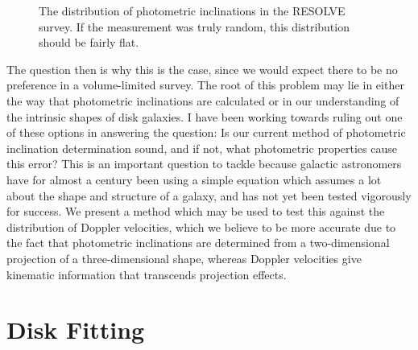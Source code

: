 \documentclass{emulateapj}
\begin{document}
\begin{figure}
\caption{The distribution of photometric inclinations in the RESOLVE survey. If the measurement was truly random, this distribution should be fairly flat. \label{fig:test}}
\end{figure}

The question then is why this is the case, since we would expect there to be no preference in a volume-limited survey. The root of this problem may lie in either the way that photometric inclinations are calculated or in our understanding of the intrinsic shapes of disk galaxies. I have been working towards ruling out one of these options in answering the question: Is our current method of photometric inclination determination sound, and if not, what photometric properties cause this error? This is an important question to tackle because galactic astronomers have for almost a century been using a simple equation which assumes a lot about the shape and structure of a galaxy, and has not yet been tested vigorously for success. We present a method which may be used to test this against the distribution of Doppler velocities, which we believe to be more accurate due to the fact that photometric inclinations are determined from a two-dimensional projection of a three-dimensional shape, whereas Doppler velocities give kinematic information that transcends projection effects.
\newpage


\section{Disk Fitting}
\end{document}
